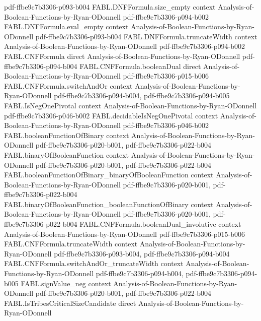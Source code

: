 \begin{theorem}
  {pdf-ffbe9c7b3306-p093-b004}
\proofstep
  {FABL.DNFFormula.size_empty}
  {context}
  {Analysis-of-Boolean-Functions-by-Ryan-ODonnell}
  {pdf-ffbe9c7b3306-p094-b002}
\proofstep
  {FABL.DNFFormula.eval_empty}
  {context}
  {Analysis-of-Boolean-Functions-by-Ryan-ODonnell}
  {pdf-ffbe9c7b3306-p093-b004}
\proofstep
  {FABL.DNFFormula.truncateWidth}
  {context}
  {Analysis-of-Boolean-Functions-by-Ryan-ODonnell}
  {pdf-ffbe9c7b3306-p094-b002}
\proofstep
  {FABL.CNFFormula}
  {direct}
  {Analysis-of-Boolean-Functions-by-Ryan-ODonnell}
  {pdf-ffbe9c7b3306-p094-b004}
\proofstep
  {FABL.CNFFormula.booleanDual}
  {direct}
  {Analysis-of-Boolean-Functions-by-Ryan-ODonnell}
  {pdf-ffbe9c7b3306-p015-b006}
\proofstep
  {FABL.CNFFormula.switchAndOr}
  {context}
  {Analysis-of-Boolean-Functions-by-Ryan-ODonnell}
  {pdf-ffbe9c7b3306-p094-b004,
    pdf-ffbe9c7b3306-p094-b005}
\proofstep
  {FABL.IsNegOnePivotal}
  {context}
  {Analysis-of-Boolean-Functions-by-Ryan-ODonnell}
  {pdf-ffbe9c7b3306-p046-b002}
\proofstep
  {FABL.decidableIsNegOnePivotal}
  {context}
  {Analysis-of-Boolean-Functions-by-Ryan-ODonnell}
  {pdf-ffbe9c7b3306-p046-b002}
\proofstep
  {FABL.booleanFunctionOfBinary}
  {context}
  {Analysis-of-Boolean-Functions-by-Ryan-ODonnell}
  {pdf-ffbe9c7b3306-p020-b001,
    pdf-ffbe9c7b3306-p022-b004}
\proofstep
  {FABL.binaryOfBooleanFunction}
  {context}
  {Analysis-of-Boolean-Functions-by-Ryan-ODonnell}
  {pdf-ffbe9c7b3306-p020-b001,
    pdf-ffbe9c7b3306-p022-b004}
\proofstep
  {FABL.booleanFunctionOfBinary_binaryOfBooleanFunction}
  {context}
  {Analysis-of-Boolean-Functions-by-Ryan-ODonnell}
  {pdf-ffbe9c7b3306-p020-b001,
    pdf-ffbe9c7b3306-p022-b004}
\proofstep
  {FABL.binaryOfBooleanFunction_booleanFunctionOfBinary}
  {context}
  {Analysis-of-Boolean-Functions-by-Ryan-ODonnell}
  {pdf-ffbe9c7b3306-p020-b001,
    pdf-ffbe9c7b3306-p022-b004}
\proofstep
  {FABL.CNFFormula.booleanDual_involutive}
  {context}
  {Analysis-of-Boolean-Functions-by-Ryan-ODonnell}
  {pdf-ffbe9c7b3306-p015-b006}
\proofstep
  {FABL.CNFFormula.truncateWidth}
  {context}
  {Analysis-of-Boolean-Functions-by-Ryan-ODonnell}
  {pdf-ffbe9c7b3306-p093-b004,
    pdf-ffbe9c7b3306-p094-b004}
\proofstep
  {FABL.CNFFormula.switchAndOr_truncateWidth}
  {context}
  {Analysis-of-Boolean-Functions-by-Ryan-ODonnell}
  {pdf-ffbe9c7b3306-p094-b004,
    pdf-ffbe9c7b3306-p094-b005}
\proofstep
  {FABL.signValue_neg}
  {context}
  {Analysis-of-Boolean-Functions-by-Ryan-ODonnell}
  {pdf-ffbe9c7b3306-p020-b001,
    pdf-ffbe9c7b3306-p022-b004}
\proofstep
  {FABL.IsTribesCriticalSizeCandidate}
  {direct}
  {Analysis-of-Boolean-Functions-by-Ryan-ODonnell}

\end{theorem}
